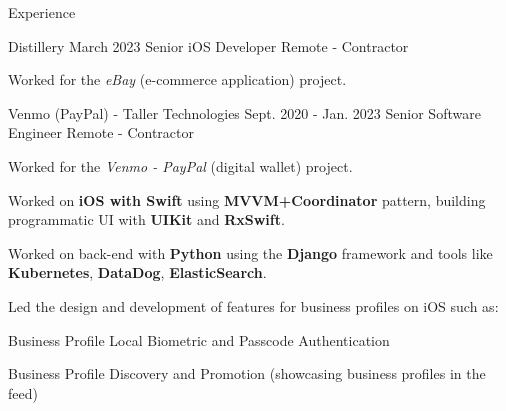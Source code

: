 \documentclass{curriculum}
\begin{document}
\begin{cvsection}{Experience}


    \makesectionitemheader
        {Distillery}                                               {March 2023}
        {Senior iOS Developer}                                     {Remote - Contractor}

        \begin{sectionitemlist}

        \item{
            Worked for the \textit{eBay} (e-commerce application) project.
        }

        \end{sectionitemlist}


    \makesectionitemheader
        {Venmo (PayPal) - Taller Technologies}              {Sept. 2020 - Jan. 2023}
        {Senior Software Engineer}                                 {Remote - Contractor}

        \begin{sectionitemlist}

        \item{
            Worked for the \textit{Venmo - PayPal} (digital wallet) project.
        }

        \item{
            Worked on \textbf{iOS with Swift} using \textbf{MVVM+Coordinator} pattern,
            building programmatic UI with \textbf{UIKit} and \textbf{RxSwift}.
        }

        \item{
            Worked on back-end with \textbf{Python} using the \textbf{Django} framework
            and tools like \textbf{Kubernetes}, \textbf{DataDog}, \textbf{ElasticSearch}.
        }

        \item{
            Led the design and development of features for business profiles on iOS such as:
        }{
            \begin{colsectionitemlist}{2}
            \item{Business Profile Local Biometric and Passcode Authentication}
            \item{Business Profile Discovery and Promotion (showcasing business profiles in the feed)}
            \end{colsectionitemlist}
        }


\end{sectionitemlist}
\end{cvsection}
\end{document}
